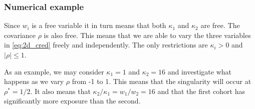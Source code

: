 \documentclass[11pt]{article}
\theoremstyle{definition}
\begin{document}
\subsubsection{Numerical example}\label{sec:num_ex}
Since $w_i$ is a free variable it in turn means that both $\kappa_1$ and $\kappa_2$ are free. The covariance $\rho$ is also free. This means that we are able to vary the three variables in \eqref{eq:2d_cred} freely and independently. The only restrictions are $\kappa_i > 0$ and $|\rho|\leq 1$.

As an example, we may consider $\kappa_1=1$ and $\kappa_2=16$ and investigate what happens as we vary $\rho$ from -1 to 1. This means that the singularity will occur at $\rho^\ast=1/2$. It also means that $\kappa_2/\kappa_1 = w_1/w_2 = 16$ and that the first cohort has significantly more exposure than the second.
\end{document}
